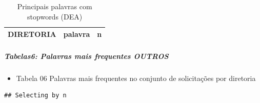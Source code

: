 \documentclass[]{article}
\newenvironment{Shaded}{\begin{snugshade}}{\end{snugshade}}
\newcommand{\DataTypeTok}[1]{\textcolor[rgb]{0.13,0.29,0.53}{#1}}
\newcommand{\DecValTok}[1]{\textcolor[rgb]{0.00,0.00,0.81}{#1}}
\newcommand{\KeywordTok}[1]{\textcolor[rgb]{0.13,0.29,0.53}{\textbf{#1}}}
\newcommand{\NormalTok}[1]{#1}
\newcommand{\OperatorTok}[1]{\textcolor[rgb]{0.81,0.36,0.00}{\textbf{#1}}}
\newcommand{\StringTok}[1]{\textcolor[rgb]{0.31,0.60,0.02}{#1}}
\providecommand{\tightlist}{%
  \setlength{\itemsep}{0pt}\setlength{\parskip}{0pt}}
\let\oldsubparagraph\subparagraph
\renewcommand{\subparagraph}[1]{\oldsubparagraph{#1}\mbox{}}
\begin{document}
\begin{table}[!h]

\caption{\label{tab:unnamed-chunk-33}Principais palavras com stopwords (DEA)}
\centering
\begin{tabular}{llr}
\toprule
\rowcolor{gray!6}  DIRETORIA & palavra & n\\


\bottomrule
\end{tabular}
\end{table}

\hypertarget{tabelas6-palavras-mais-frequentes-outros}{%
\subparagraph{Tabelas6: Palavras mais frequentes
OUTROS}\label{tabelas6-palavras-mais-frequentes-outros}}

\begin{itemize}
\tightlist
\item
  Tabela 06 Palavras mais frequentes no conjunto de solicitações por
  diretoria
\end{itemize}

\begin{Shaded}
\end{Shaded}

\begin{verbatim}
## Selecting by n
\end{verbatim}
\end{document}
